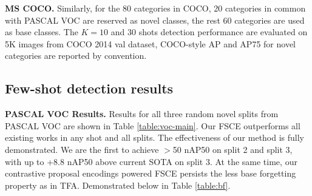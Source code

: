 \documentclass[final]{cvpr}
\begin{document}
\vspace{-2.5mm}
\textbf{MS COCO.} Similarly, for the 80 categories in COCO, 20 categories in common with PASCAL VOC are reserved as novel classes, the rest 60 categories are used as base classes. The $K=10$ and $30$ shots detection performance are evaluated on 5K images from COCO 2014 val dataset, COCO-style AP and AP75 for novel categories are reported by convention.


\vspace{-1.2mm}
\subsection{Few-shot detection results}
\vspace{-2mm}
\textbf{PASCAL VOC Results.} Results for all three random novel splits from PASCAL VOC are shown in Table \ref{table:voc-main}. Our FSCE outperforms all existing works in any shot and all splits. The effectiveness of our method is fully demonstrated. We are the first to achieve $>$50 nAP50 on split 2 and split 3, with up to +8.8 nAP50 above current SOTA on split 3. At the same time, our contrastive proposal encodings powered FSCE persists the less base forgetting property as in TFA. Demonstrated below in Table \ref{table:bf}.  

\vspace{-1.2mm}
\begin{table}[h]\normalsize \begin{center}
\end{center}
\vspace{-2mm}
\caption{Base forgetting comparisons on PASCAL VOC Split 1. Before fine-tuning, the base AP50 in base training is 80.8. }
\label{table:bf}
\end{table}
\end{document}
